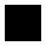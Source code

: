 \documentclass{article}
\begin{document}
\noindent\includegraphics[width=\linewidth]{output}
\end{document}
